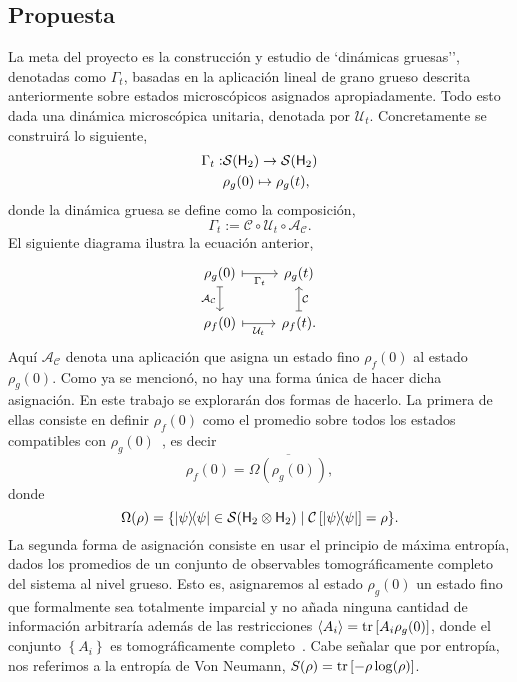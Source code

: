 \documentclass[10pt]{article}
\newcommand{\mcU}{\mathcal{U}}
\newcommand{\mcS}{\mathcal{S}}
\newcommand{\hilbert}{{\sf H}}
\newcommand{\mcC}{\mathcal{C}}
\newcommand{\mcA}{\mathcal{A}}
\begin{document}
\subsection{Propuesta}
La meta del proyecto es la construcción y estudio de `dinámicas gruesas'', denotadas como $\Gamma_t$, basadas en la aplicación lineal de grano grueso descrita anteriormente sobre estados microscópicos asignados apropiadamente. Todo esto dada una dinámica microscópica unitaria, denotada por $\mcU_t$. Concretamente se construirá lo siguiente,
\begin{align*}
\Gamma_{t}:&\mcS(\hilbert_2)\rightarrow \mcS(\hilbert_2)\\
&\rho_g(0) \mapsto \rho_g(t),
\end{align*}
donde la dinámica gruesa se define como la composición,
\begin{equation*}
\Gamma_t:=\mcC \circ \mcU_t \circ \mcA_\mcC.
\end{equation*}
El siguiente diagrama ilustra la ecuación anterior,
\[\begin{tikzcd}[arrows={<-|}]
\rho_{g}(0)  & \rho_{g}(t) \arrow{l}{\Gamma_{t}} \arrow{d}{\mcC}\\
\rho_{f}(0) \arrow{u}{\mcA_{\mcC}} & \rho_{f}(t). \arrow{l}{\mcU_{t}}
\end{tikzcd}
\]
Aquí $\mcA_\mcC$ denota una aplicación que asigna un estado fino $\rho_f(0)$ al estado $\rho_g(0)$. Como ya se mencionó, no hay una forma única de hacer dicha asignación. En este trabajo se explorarán dos formas de hacerlo. La primera de ellas consiste en definir $\rho_f(0)$ como el promedio sobre todos los estados compatibles con $\rho_g(0)$~\cite{Macro-To-Micro}, es decir
$$\rho_f(0)=\overline{\Omega(\rho_g(0))},$$
donde
\begin{equation*}
\Omega(\rho)=\{\dyad{\psi}\in \mcS(\hilbert_2 \otimes \hilbert_2) \mid \mcC\left[\dyad{\psi}\right]=\rho\}.
\end{equation*}
La segunda forma de asignación consiste en usar el principio de máxima entropía, dados los promedios de un conjunto de observables tomográficamente completo del sistema al nivel grueso. Esto es, asignaremos al estado $\rho_g(0)$ un estado fino que formalmente sea totalmente imparcial y no añada ninguna cantidad de información arbitraría además de las restricciones $\langle A_i \rangle=\tr \left[ A_i \rho_g(0) \right]$, donde el conjunto $\left\{A_i \right\}$ es tomográficamente completo~\cite{jaynes}. Cabe señalar que por entropía, nos referimos a la entropía de Von Neumann, $S(\rho)=\tr \left[ -\rho \log(\rho) \right]$.
\end{document}
